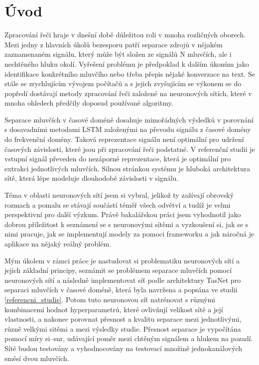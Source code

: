 \chapter{Úvod}
Zpracování řeči hraje v dnešní době důležitou roli v mnoha rozličných oborech. Mezi jedny z hlavních úkolů bezesporu patří separace zdrojů v nějakém zaznamenaném signálu, který může být složen ze signálů N mluvčích, ale i nechtěného hluku okolí. Vyřešení problému je předpoklad k dalším úkonům jako identifikace konkrétního mluvčího nebo třeba přepis nějaké konverzace na text. Se stále se zrychlujícím vývojem počítačů a s jejich zvyšujícím se výkonem se do popředí dostávají metody zpracování řeči založené na neuronových sítích, které v mnoha ohledech předčily doposud používané algoritmy.

Separace mluvčích v časové doméně dosahuje mimořádných výsledků v porovnání s dosavadními metodami LSTM založenými na převodu signálu z časové domény do frekvenční domény. Taková reprezentace signálu není optimální pro udržení časových závislostí, které jsou při zpracování řeči podstatné. V referenční studii je vstupní signál převeden do nezáporné reprezentace, která je optimální pro extrakci jednotlivých mluvčích. Silnou stránkou systému je hluboká architektura sítě, která lépe modeluje dlouhodobé závislosti v signálu.

Téma v oblasti neuronových sítí jsem si vybral, jelikož ty zažívají obrovský rozmach a pomalu se stávají součástí téměř všech odvětví a tudíž je velmi perspektivní pro další výzkum. Právě bakalářskou práci jsem vyhodnotil jako dobrou příležitost k seznámení se s neuronovými sítěmi a vyzkoušení si, jak se s nimi pracuje, jak se implementují modely za pomoci frameworku a jak náročná je aplikace na nějaký reálný problém.

Mým úkolem v rámci práce je nastudovat si problematiku neuronových sítí a jejich základní principy, seznámit se problémem separace mluvčích pomocí neuronových sítí a následně implementovat síť podle architektury TasNet pro separaci mluvčích v časové doméně, která byla navržena a popsána ve studii \ref{referencni_studie}. Potom tuto neuronovou síť natrénovat s různými kombinacemi hodnot hyperparametrů, které ovlivňují velikost sítě a její vlastnosti, a nakonec porovnat přesnost a kvalitu separace mezi jednotlivými, různě velkými sitěmi a mezi výsledky studie. Přesnost separace je vypočítána pomocí míry si--snr, udávající poměr mezi chtěným signálem a hlukem na pozadí. Sítě budou testovány a vyhodnocovány na testovací množině jednokanálových směsí dvou mluvčích.

